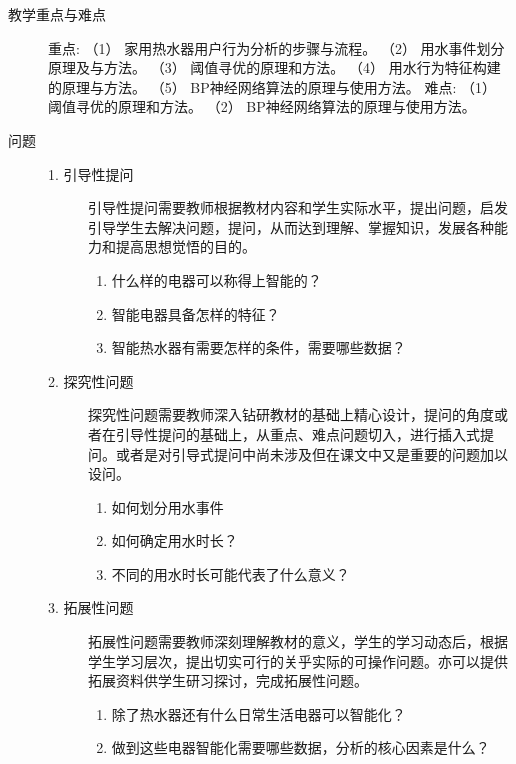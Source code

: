 \documentclass[12pt,a4paper,openany,cap]{ctexbook}
\begin{document}
\begin{description}
\item[教学重点与难点]    重点:
    （1） 家用热水器用户行为分析的步骤与流程。
    （2） 用水事件划分原理及与方法。
    （3） 阈值寻优的原理和方法。
    （4） 用水行为特征构建的原理与方法。
    （5） BP神经网络算法的原理与使用方法。
            难点:
    （1） 阈值寻优的原理和方法。
    （2） BP神经网络算法的原理与使用方法。
\item[问题]
  \begin{minipage}[t]{0.8\linewidth}
    \begin{description}
    \item[1. 引导性提问]       
引导性提问需要教师根据教材内容和学生实际水平，提出问题，启发引导学生去解决问题，提问，从而达到理解、掌握知识，发展各种能力和提高思想觉悟的目的。
\begin{enumerate}
\item      什么样的电器可以称得上智能的？
\item\label{item:246}  智能电器具备怎样的特征？
\item\label{item:247}  智能热水器有需要怎样的条件，需要哪些数据？
\end{enumerate}
\item[2. 探究性问题]
探究性问题需要教师深入钻研教材的基础上精心设计，提问的角度或者在引导性提问的基础上，从重点、难点问题切入，进行插入式提问。或者是对引导式提问中尚未涉及但在课文中又是重要的问题加以设问。
\begin{enumerate}
\item      如何划分用水事件
\item\label{item:248}  如何确定用水时长？
\item\label{item:249}  不同的用水时长可能代表了什么意义？
\end{enumerate}
\item[3. 拓展性问题] 
拓展性问题需要教师深刻理解教材的意义，学生的学习动态后，根据学生学习层次，提出切实可行的关乎实际的可操作问题。亦可以提供拓展资料供学生研习探讨，完成拓展性问题。
\begin{enumerate}
\item      除了热水器还有什么日常生活电器可以智能化？
\item\label{item:250}  做到这些电器智能化需要哪些数据，分析的核心因素是什么？ 
\end{enumerate}
    \end{description}
  \end{minipage}


\end{description}
\end{document}
